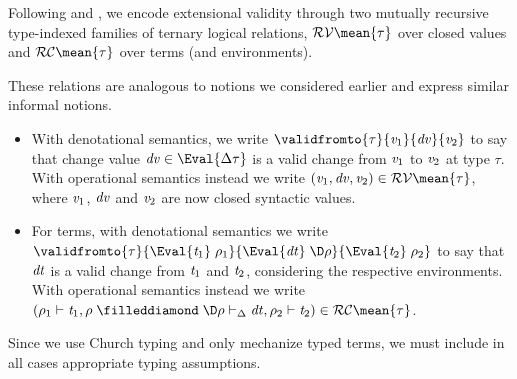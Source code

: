 Following \citet{Ahmed2006stepindexed} and \citet*{Acar08}, we
encode extensional validity
through two mutually recursive type-indexed families of ternary
logical relations, \ensuremath{\mathcal{RV}\mean{\tau}} over closed values and \ensuremath{\mathcal{RC}\mean{\tau}} over terms (and environments).

These relations are analogous to notions we considered earlier
and express similar informal notions.
\begin{itemize}
\item With denotational semantics, we write \ensuremath{\validfromto{\tau}{\Varid{v}_{1}}{\Varid{dv}}{\Varid{v}_{2}}} to say
  that change value \ensuremath{\Varid{dv}\in \Eval{\Delta \tau}} is a valid change from
  \ensuremath{\Varid{v}_{1}} to \ensuremath{\Varid{v}_{2}} at type \ensuremath{\tau}. With operational semantics instead we
  write \ensuremath{(\Varid{v}_{1},\Varid{dv},\Varid{v}_{2})\in \mathcal{RV}\mean{\tau}}, where \ensuremath{\Varid{v}_{1}}, \ensuremath{\Varid{dv}} and \ensuremath{\Varid{v}_{2}}
  are now closed syntactic values.
\item For terms, with denotational semantics we write \ensuremath{\validfromto{\tau}{\Eval{\Varid{t}_{1}}\;\rho_{1}}{\Eval{\Varid{dt}}\;\D\rho}{\Eval{\Varid{t}_{2}}\;\rho_{2}}} to say that \ensuremath{\Varid{dt}} is a
  valid change from \ensuremath{\Varid{t}_{1}} and \ensuremath{\Varid{t}_{2}}, considering the respective
  environments. With operational semantics instead we write
  \ensuremath{(\rho_{1}\vdash\Varid{t}_{1},\rho\mathrel{\filleddiamond}\D\rho\vdash_{\Delta}\Varid{dt},\rho_{2}\vdash\Varid{t}_{2})\in \mathcal{RC}\mean{\tau}}.
\end{itemize}

Since we use Church typing and only mechanize typed terms, we
must include in all cases appropriate typing assumptions.

